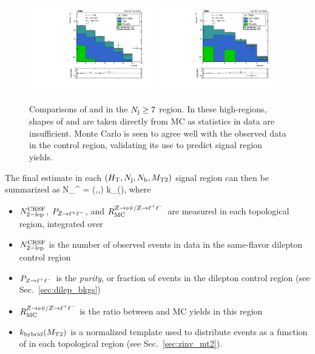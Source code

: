 \begin{figure}[ht]
  \begin{center}
    \includegraphics[width=0.48\textwidth]{figs/zinv/crdybase_nJet30_ge7j.pdf}
    \includegraphics[width=0.48\textwidth]{figs/zinv/crdybase_nBJet20_ge7j.pdf} \\
    \caption{Comparisons of \Nj and \Nb in the $N_{\mathrm{j}}\geq7$ region. In these high-\Nj regions, 
      shapes of \Nj and \Nb are taken directly from MC as statistics in data are insufficient.
      Monte Carlo is seen to agree well with the observed data in the control region, 
      validating its use to predict signal region yields.
            }
    \label{fig:zll_ge7j}
  \end{center}
\end{figure}


The final estimate in each $(H_{\mathrm{T}},N_{\mathrm{j}},N_{\mathrm{b}},M_{\mathrm{T2}})$ signal region can then be summarized as
\be\label{eq:zinv_est}
N_{\znunu}^ = 
(\Ht,\Nj,\Nb) \times k_(\mttwo),
\ee
where
\begin{itemize}\setlength\itemsep{-1mm}
\item $N_{\mathrm{2-lep}}^{\mathrm{CRSF}}$, $P_{Z\to\ell^+\ell^-}$, and $R_{\mathrm{MC}}^{Z\to\nu\bar{\nu}/Z\to\ell^+\ell^-}$ are measured in each topological
region, integrated over \mttwo
\item $N_{\mathrm{2-lep}}^{\mathrm{CRSF}}$ is the number of observed events in data in the same-flavor dilepton control region
\item $P_{Z\to\ell^+\ell^-}$ is the \emph{purity}, or fraction of \zll events in the dilepton control region 
(see Sec.~\ref{sec:dilep_bkgs})
\item $R_{\mathrm{MC}}^{Z\to\nu\bar{\nu}/Z\to\ell^+\ell^-}$ is the ratio between \znunu and \zll MC yields in this region
\item $k_{\mathrm{hybrid}}(M_{\mathrm{T2}})$ is a normalized template used to distribute events as a function
of \mttwo in each topological region (see Sec.~\ref{sec:zinv_mt2}).
\end{itemize}


